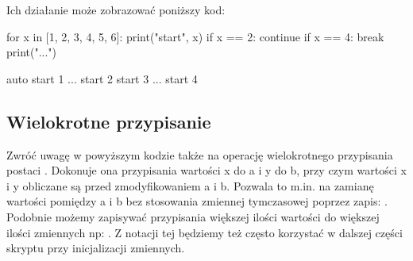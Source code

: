 Ich działanie może zobrazować poniższy kod:
\begin{CodeFrame}[python]{0.50\textwidth}
for x in [1, 2, 3, 4, 5, 6]:
  print("start", x)
  if x == 2:
    continue
  if x == 4:
    break
  print("...")
\end{CodeFrame}
\begin{CodeFrame}{auto}
start 1
...
start 2
start 3
...
start 4
\end{CodeFrame}


\subsection{Wielokrotne przypisanie}

Zwróć uwagę w powyższym kodzie także na operację wielokrotnego przypisania postaci .
Dokonuje ona przypisania wartości x do a i y do b, przy czym wartości x i y obliczane są przed zmodyfikowaniem a i b.
Pozwala to m.in. na zamianę wartości pomiędzy a i b bez stosowania zmiennej tymczasowej poprzez zapis: .
Podobnie możemy zapisywać przypisania większej ilości wartości do większej ilości zmiennych np: .
Z notacji tej będziemy też często korzystać w dalszej części skryptu przy inicjalizacji zmiennych.
